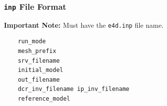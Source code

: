 \documentclass[a4paper,12pt]{article}
\begin{document}
\subsubsection{\texttt{inp} File Format} \label{inversion_inp}

\begin{framed}
\noindent \textbf{Important Note:} Must have the \texttt{e4d.inp} file name.
\end{framed}

\begin{framed}
\begin{verbatim}
    run_mode
    mesh_prefix
    srv_filename
    initial_model
    out_filename
    dcr_inv_filename ip_inv_filename
    reference_model
\end{verbatim}
\end{framed}
\end{document}
